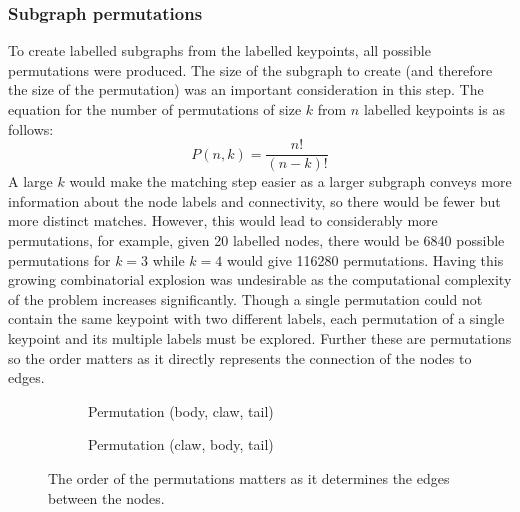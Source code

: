\subsubsection{Subgraph permutations}
To create labelled subgraphs from the labelled keypoints, all possible permutations were produced. The size of the subgraph to create (and therefore the size of the permutation) was an important consideration in this step. The equation for the number of permutations of size $k$ from $n$ labelled keypoints is as follows:
\begin{equation}
P(n, k) = \frac{n!}{(n-k)!}
\end{equation}
A large $k$ would make the matching step easier as a larger subgraph conveys more information about the node labels and connectivity, so there would be fewer but more distinct matches. However, this would lead to considerably more permutations, for example, given 20 labelled nodes, there would be 6840 possible permutations for $k=3$ while $k=4$ would give 116280 permutations. Having this growing combinatorial explosion was undesirable as the computational complexity of the problem increases significantly. Though a single permutation could not contain the same keypoint with two different labels, each permutation of a single keypoint and its multiple labels must be explored. Further these are permutations so the order matters as it directly represents the connection of the nodes to edges.
\begin{figure}[H]
\centering
	\begin{subfigure}{0.45\textwidth}
	\centering
	\caption{Permutation (body, claw, tail)}
	\end{subfigure}
	\hspace*{\fill}
	\begin{subfigure}{0.45\textwidth}
	\centering
	\caption{Permutation (claw, body, tail)}
	\end{subfigure}
\caption{The order of the permutations matters as it determines the edges between the nodes.}
\end{figure}
